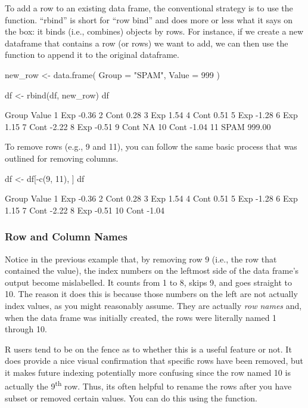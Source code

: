 To add a row to an existing data frame, the conventional strategy is to use the  function. ``rbind'' is short for ``row bind'' and does more or less what it says on the box: it binds (i.e., combines) objects by rows. For instance, if we create a new dataframe that contains a row (or rows) we want to add, we can then use the  function to append it to the original dataframe.

\begin{inR}
new_row <- data.frame(
  Group = "SPAM",
  Value = 999
)
                      
df <- rbind(df, new_row)
df
\end{inR}
\begin{outR}
   Group  Value
1    Exp  -0.36
2   Cont   0.28
3    Exp   1.54
4   Cont   0.51
5    Exp  -1.28
6    Exp   1.15
7   Cont  -2.22
8    Exp  -0.51
9   Cont     NA
10  Cont  -1.04
11  SPAM 999.00
\end{outR}

To remove rows (e.g., 9 and 11), you can follow the same basic process that was outlined for removing columns.

\begin{inR}
df <- df[-c(9, 11), ]
df
\end{inR}
\begin{outR}
   Group Value
1    Exp -0.36
2   Cont  0.28
3    Exp  1.54
4   Cont  0.51
5    Exp -1.28
6    Exp  1.15
7   Cont -2.22
8    Exp -0.51
10  Cont -1.04
\end{outR}

\subsubsection{Row and Column Names}

Notice in the previous example that, by removing row 9 (i.e., the row that contained the  value), the index numbers on the leftmost side of the data frame's output become mislabelled. It counts from 1 to 8, skips 9, and goes straight to 10. The reason it does this is because those numbers on the left are not actually index values, as you might reasonably assume. They are actually \textit{row names} and, when the data frame was initially created, the rows were literally named 1 through 10.  

R users tend to be on the fence as to whether this is a useful feature or not.  It does provide a nice visual confirmation that specific rows have been removed, but it makes future indexing potentially more confusing since the row named 10 is actually the 9\textsuperscript{th} row.  Thus, its often helpful to rename the rows after you have subset or removed certain values. You can do this using the  function.

